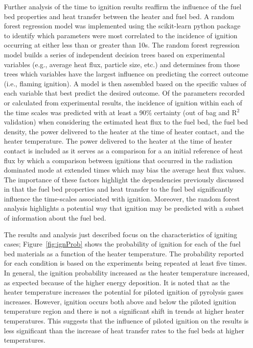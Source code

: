     Further analysis of the time to ignition results reaffirm the influence of the fuel bed properties and heat transfer between the heater and fuel bed. A random forest regression model was implemented using the scikit-learn python package~\cite{scikit-learn} to identify which parameters were most correlated to the incidence of ignition occurring at either less than or greater than 10\si{\second}. The random forest regression model builds a series of independent decision trees based on experimental variables (e.g., average heat flux, particle size, etc.) and determines from those trees which variables have the largest influence on predicting the correct outcome (i.e., flaming ignition). A model is then assembled based on the specific values of each variable that best predict the desired outcome. Of the parameters recorded or calculated from experimental results, the incidence of ignition within each of the time scales was predicted with at least a 90\% certainty (out of bag and R$^{2}$ validation) when considering the estimated heat flux to the fuel bed, the fuel bed density, the power delivered to the heater at the time of heater contact, and the heater temperature. The power delivered to the heater at the time of heater contact is included as it serves as a comparison for a an initial reference of heat flux by which a comparison between ignitions that occurred in the radiation dominated mode at extended times which may bias the average heat flux values. The importance of these factors highlight the dependencies previously discussed in that the fuel bed properties and heat transfer to the fuel bed significantly influence the time-scales associated with ignition.  Moreover, the random forest analysis highlights a potential way that ignition may be predicted with a subset of information about the fuel bed. 
    
   The results and analysis just described focus on the characteristics of igniting cases; Figure~\ref{fig:ignProb} shows the probability of ignition for each of the fuel bed materials as a function of the heater temperature. The probability reported for each condition is based on the experiments being repeated at least five times.  In general, the ignition probability increased as the heater temperature increased, as expected because of the higher energy deposition. It is noted that as the heater temperature increases the potential for piloted ignition of pyrolysis gases increases. However, ignition occurs both above and below the piloted ignition temperature region and there is not a significant shift in trends at higher heater temperatures. This suggests that the influence of piloted ignition on the results is less significant than the increase of heat transfer rates to the fuel beds at higher temperatures. 
   
